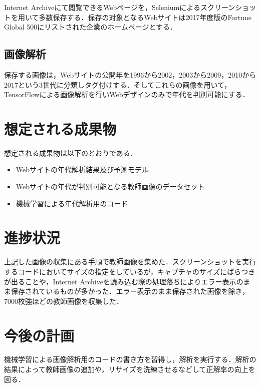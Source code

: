 \documentclass[uplatex,twocolumn,dvipdfmx]{jsarticle}
\begin{document}
Internet Archiveにて閲覧できるWebページを，Seleniumによるスクリーンショットを用いて多数保存する．保存の対象となるWebサイトは2017年度版のFortune Global 500\cite{bib003}にリストされた企業のホームページとする．

\subsection{画像解析}

保存する画像は，Webサイトの公開年を1996から2002，2003から2009，2010から2017という3世代に分類しタグ付けする．そしてこれらの画像を用いて，TensorFlowによる画像解析を行いWebデザインのみで年代を判別可能にする．


\section{想定される成果物}

想定される成果物は以下のとおりである．

\begin{itemize}
\item Webサイトの年代解析結果及び予測モデル
\item Webサイトの年代が判別可能となる教師画像のデータセット
\item 機械学習による年代解析用のコード
\end{itemize}

\section{進捗状況}

上記した画像の収集にある手順で教師画像を集めた．スクリーンショットを実行するコードにおいてサイズの指定をしているが，キャプチャのサイズにばらつきが出ることや，Internet Archiveを読み込む際の処理落ちによりエラー表示のまま保存されているものが多かった．エラー表示のまま保存された画像を除き，7000枚強ほどの教師画像を収集した．

\section{今後の計画}

機械学習による画像解析用のコードの書き方を習得し，解析を実行する．解析の結果によって教師画像の追加や，リサイズを洗練させるなどして正解率の向上を図る．


\end{document}

